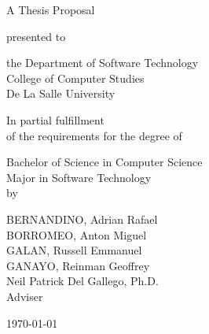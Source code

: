 %
%
%                 

\begin{titlepage}
\centering



\vspace{1.5cm}

A Thesis Proposal\\

\vspace{0.5cm}

presented to\\

\vspace{0.5cm}

the Department of Software Technology\\
College of Computer Studies\\
De La Salle University

\vspace{1cm}

In partial fulfillment\\
of the requirements for the degree of\\

\vspace{0.5cm}

Bachelor of Science in Computer Science\\
Major in Software Technology
\vspace{1.75cm}
\\by\\


\vspace{1cm}

BERNANDINO, Adrian Rafael  \\
BORROMEO, Anton Miguel  \\
GALAN, Russell Emmanuel  \\
GANAYO, Reinman Geoffrey  \\

\vspace{1.75cm}
Neil Patrick Del Gallego, Ph.D.  \\
Adviser

\vspace{1.3cm}
\today
\end{titlepage}
